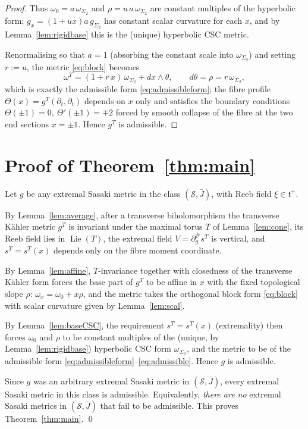 \documentclass{amsart}
\theoremstyle{definition}
\DeclareMathOperator{\Lie}{Lie}
\begin{document}
\begin{proof}
Thus $\omega_0=a\,\omega_{\Sigma_2}$ and $\rho=u\,a\,\omega_{\Sigma_2}$ are
constant multiples of the hyperbolic form; $g_x=(1+ux)a\,g_{\Sigma_2}$ has
constant scalar curvature for each $x$, and by Lemma~\ref{lem:rigidbase} this is
the (unique) hyperbolic CSC metric.

Renormalising so that $a=1$ (absorbing the constant scale into
$\omega_{\Sigma_2}$) and setting $r:=u$, the metric \eqref{eq:block} becomes
\[
  \omega^T=(1+r\,x)\,\omega_{\Sigma_2}+dx\wedge\theta,\qquad d\theta=\rho=r\,\omega_{\Sigma_2},
\]
which is exactly the admissible form \eqref{eq:admissibleform}; the fibre profile
$\Theta(x)=g^T(\partial_t,\partial_t)$ depends on $x$ only and satisfies the
boundary conditions $\Theta(\pm1)=0,\ \Theta'(\pm1)=\mp2$ forced by smooth
collapse of the fibre at the two end sections $x=\pm1$. Hence $g^T$ is
admissible.
\end{proof}

\section{Proof of Theorem~\ref{thm:main}}

Let $g$ be any extremal Sasaki metric in the class $(\mathcal S,\bar J)$, with
Reeb field $\xi\in\mathfrak t^+$.

By Lemma~\ref{lem:average}, after a transverse biholomorphism the transverse
K\"ahler metric $g^T$ is invariant under the maximal torus $T$ of
Lemma~\ref{lem:cone}, its Reeb field lies in $\Lie(T)$, the extremal field
$V=\partial^\#_g s^T$ is vertical, and $s^T=s^T(x)$ depends only on the fibre
moment coordinate.

By Lemma~\ref{lem:affine}, $T$-invariance together with closedness of the
transverse K\"ahler form forces the base part of $g^T$ to be affine in $x$ with
the fixed topological slope $\rho$: $\omega_x=\omega_0+x\rho$, and the metric
takes the orthogonal block form \eqref{eq:block} with scalar curvature given by
Lemma~\ref{lem:scal}.

By Lemma~\ref{lem:baseCSC}, the requirement $s^T=s^T(x)$ (extremality) then
forces $\omega_0$ and $\rho$ to be constant multiples of the (unique, by
Lemma~\ref{lem:rigidbase}) hyperbolic CSC form $\omega_{\Sigma_2}$, and the
metric to be of the admissible form
\eqref{eq:admissibleform}--\eqref{eq:admissible}. Hence $g$ is admissible.

Since $g$ was an arbitrary extremal Sasaki metric in $(\mathcal S,\bar J)$,
every extremal Sasaki metric in this class is admissible. Equivalently,
\emph{there are no} extremal Sasaki metrics in $(\mathcal S,\bar J)$ that fail
to be admissible. This proves Theorem~\ref{thm:main}. \qed
\end{document}
